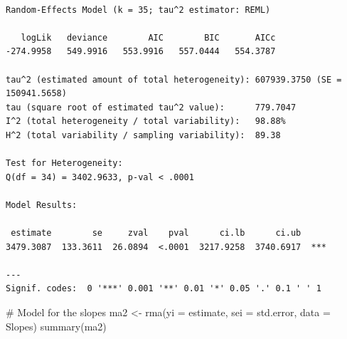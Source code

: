 \documentclass[
  letterpaper,
]{book}
\newenvironment{Shaded}{\begin{snugshade}}{\end{snugshade}}
\newcommand{\AttributeTok}[1]{\textcolor[rgb]{0.40,0.45,0.13}{#1}}
\newcommand{\CommentTok}[1]{\textcolor[rgb]{0.37,0.37,0.37}{#1}}
\newcommand{\FunctionTok}[1]{\textcolor[rgb]{0.28,0.35,0.67}{#1}}
\newcommand{\NormalTok}[1]{\textcolor[rgb]{0.00,0.23,0.31}{#1}}
\newcommand{\OtherTok}[1]{\textcolor[rgb]{0.00,0.23,0.31}{#1}}
\newcommand{\SpecialCharTok}[1]{\textcolor[rgb]{0.37,0.37,0.37}{#1}}
\newcommand{\StringTok}[1]{\textcolor[rgb]{0.13,0.47,0.30}{#1}}
\begin{document}
\begin{Shaded}
\end{Shaded}

\begin{verbatim}

Random-Effects Model (k = 35; tau^2 estimator: REML)

   logLik   deviance        AIC        BIC       AICc   
-274.9958   549.9916   553.9916   557.0444   554.3787   

tau^2 (estimated amount of total heterogeneity): 607939.3750 (SE = 150941.5658)
tau (square root of estimated tau^2 value):      779.7047
I^2 (total heterogeneity / total variability):   98.88%
H^2 (total variability / sampling variability):  89.38

Test for Heterogeneity:
Q(df = 34) = 3402.9633, p-val < .0001

Model Results:

 estimate        se     zval    pval      ci.lb      ci.ub      
3479.3087  133.3611  26.0894  <.0001  3217.9258  3740.6917  *** 

---
Signif. codes:  0 '***' 0.001 '**' 0.01 '*' 0.05 '.' 0.1 ' ' 1
\end{verbatim}

\begin{Shaded}
\begin{Highlighting}[]
\CommentTok{\# Model for the slopes}
\NormalTok{ma2 }\OtherTok{\textless{}{-}} \FunctionTok{rma}\NormalTok{(}\AttributeTok{yi =}\NormalTok{ estimate, }\AttributeTok{sei =}\NormalTok{ std.error, }\AttributeTok{data =}\NormalTok{ Slopes)}
\FunctionTok{summary}\NormalTok{(ma2)}
\end{Highlighting}
\end{Shaded}
\end{document}
